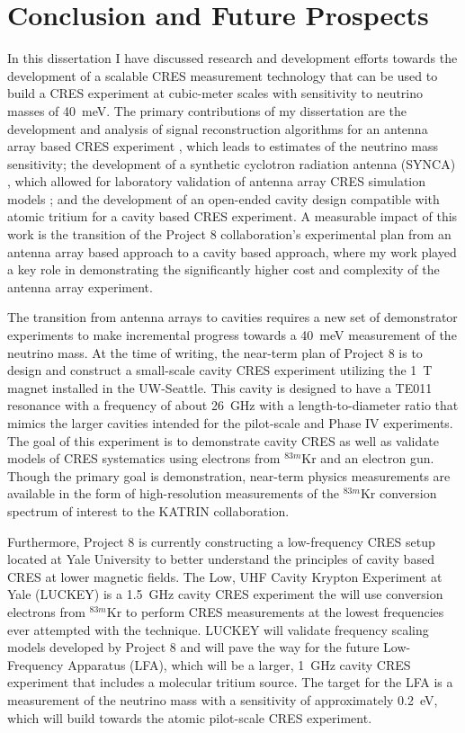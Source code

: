 
\chapter{Conclusion and Future Prospects}

In this dissertation I have discussed research and development efforts towards the development of a scalable CRES measurement technology that can be used to build a CRES experiment at cubic-meter scales with sensitivity to neutrino masses of 40~meV. The primary contributions of my dissertation are the development and analysis of signal reconstruction algorithms for an antenna array based CRES experiment \cite{p8phase3trigger}, which leads to estimates of the neutrino mass sensitivity; the development of a synthetic cyclotron radiation antenna (SYNCA) \cite{p8synca}, which allowed for laboratory validation of antenna array CRES simulation models \cite{p8jugaad}; and the development of an open-ended cavity design compatible with atomic tritium for a cavity based CRES experiment. A measurable impact of this work is the transition of the Project 8 collaboration's experimental plan from an antenna array based approach to a cavity based approach, where my work played a key role in demonstrating the significantly higher cost and complexity of the antenna array experiment.

The transition from antenna arrays to cavities requires a new set of demonstrator experiments to make incremental progress towards a 40~meV measurement of the neutrino mass. At the time of writing, the near-term plan of Project 8 is to design and construct a small-scale cavity CRES experiment utilizing the 1~T magnet installed in the UW-Seattle. This cavity is designed to have a TE011 resonance with a frequency of about 26~GHz with a length-to-diameter ratio that mimics the larger cavities intended for the pilot-scale and Phase IV experiments. The goal of this experiment is to demonstrate cavity CRES as well as validate models of CRES systematics using electrons from $^{83m}$Kr and an electron gun. Though the primary goal is demonstration, near-term physics measurements are available in the form of high-resolution measurements of the $^{83m}$Kr conversion spectrum of interest to the KATRIN collaboration.

Furthermore, Project 8 is currently constructing a low-frequency CRES setup located at Yale University to better understand the principles of cavity based CRES at lower magnetic fields. The Low, UHF Cavity Krypton Experiment at Yale (LUCKEY) is a 1.5~GHz cavity CRES experiment the will use conversion electrons from $^{83m}$Kr to perform CRES measurements at the lowest frequencies ever attempted with the technique. LUCKEY will validate frequency scaling models developed by Project 8 and will pave the way for the future Low-Frequency Apparatus (LFA), which will be a larger, 1~GHz cavity CRES experiment that includes a molecular tritium source. The target for the LFA is a measurement of the neutrino mass with a sensitivity of approximately 0.2~eV, which will build towards the atomic pilot-scale CRES experiment.

